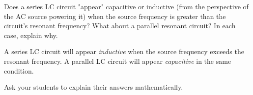 

Does a series LC circuit "appear" capacitive or inductive (from the perspective of the AC source powering it) when the source frequency is greater than the circuit's resonant frequency?  What about a parallel resonant circuit?  In each case, explain why.







A series LC circuit will appear {\it inductive} when the source frequency exceeds the resonant frequency.  A parallel LC circuit will appear {\it capacitive} in the same condition.







Ask your students to explain their answers mathematically.




